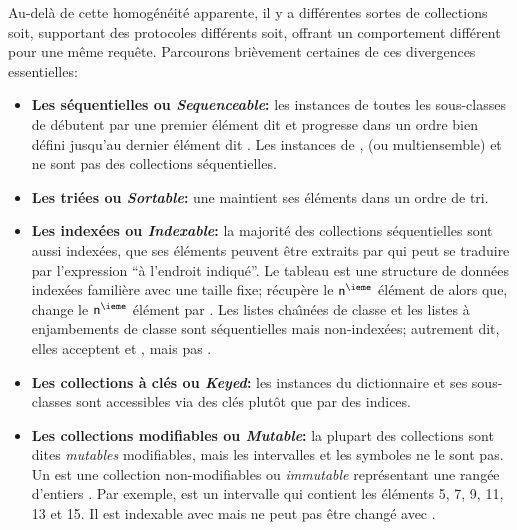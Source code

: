 \documentclass[a4paper,10pt,twoside]{book}
\begin{document}
Au-del\`a de cette homog\'en\'eit\'e apparente, 
il y a diff\'erentes sortes de collections soit, supportant des protocoles 
diff\'erents soit, offrant un comportement diff\'erent pour une m\^eme requ\^ete.
Parcourons bri\`evement certaines de ces divergences essentielles:

\begin{itemize}
  \item {\bf Les s\'equentielles ou \emph{Sequenceable}:}
  les instances de toutes les sous-classes de  
d\'ebutent par une premier \'el\'ement dit  et progresse dans un ordre bien d\'efini jusqu'au
dernier \'el\'ement dit .
Les instances de ,  (ou multiensemble) et  ne sont pas
des collections s\'equentielles.

  \item {\bf Les tri\'ees ou \emph{Sortable}:}
une  maintient ses \'el\'ements dans un ordre de 
tri.

  \item {\bf Les index\'ees ou \emph{Indexable}:}
la majorit\'e des collections s\'equentielles sont aussi index\'ees, \cad
que ses \'el\'ements peuvent \^etre extraits par 	
 qui peut se traduire par l'expression ``\`a l'endroit indiqu\'e''.
	Le tableau  est une structure de donn\'ees index\'ees famili\`ere avec une taille fixe;   r\'ecup\`ere le
 $\mbox{\ct{n}}^{\ieme}$ \'el\'ement de  alors que, 
 change le $\mbox{\ct{n}}^{\ieme}$ \'el\'ement 
par .
	Les listes cha\^{\i}n\'ees de classe  et
les listes \`a enjambements de classe  sont s\'equentielles mais non-index\'ees; autrement dit, elles acceptent  et , mais pas .

  \item {\bf Les collections \`a cl\'es ou \emph{Keyed}:}
	les instances du dictionnaire  et ses sous-classes
sont accessibles via des cl\'es plut\^ot que par des indices.

  \item {\bf Les collections modifiables ou \emph{Mutable}:}
  	la plupart des collections sont dites \emph{mutables} \cad modifiables, mais les intervalles  et les symboles  ne le sont pas.
	Un  est une collection non-modifiables ou \emph{immutable} repr\'esentant une rang\'ee d'entiers .  Par exemple, 
 est un intervalle  qui contient les 
\'el\'ements 5, 7, 9, 11, 13 et 15.  Il est indexable avec  mais ne peut pas \^etre chang\'e avec .


\end{itemize}
\end{document}
